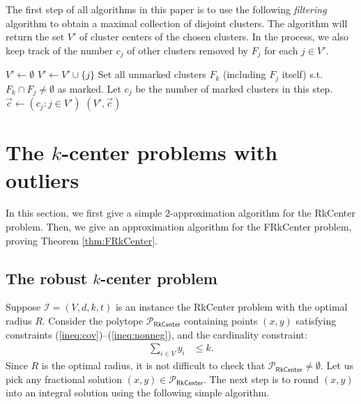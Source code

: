 \documentclass[a4paper,11pt]{article}
\newcommand{\I}{\mathcal{I}}
\renewcommand{\P}{\mathcal{P}}
\begin{document}
The first step of all algorithms in this paper is to use the following \emph{filtering} algorithm to obtain a maximal collection of disjoint clusters. The algorithm will return the set $V'$ of cluster centers of the chosen clusters. In the process, we also keep track of the number $c_j$ of other clusters removed by $F_j$ for each $j \in V'$.

\begin{algorithm}[h]
\caption{$\textsc{RFiltering}\left(x,y \right)$}
\begin{algorithmic}[1]
\STATE $V' \gets \emptyset$
	\STATE $V' \gets V' \cup \{j\}$
	\STATE Set all unmarked clusters $F_k$ (including $F_j$ itself) s.t. $F_k \cap F_j \neq \emptyset$ as marked.
	\STATE Let $c_j$ be the number of marked clusters in this step. 
\ENDFOR
\STATE $\vec{c} \gets (c_j: j \in V')$
\RETURN $(V', \vec{c})$
\end{algorithmic} 
\end{algorithm}



\section{The $k$-center problems with outliers}
In this section, we first give a simple $2$-approximation algorithm for the \textsf{RkCenter} problem. Then, we give an approximation algorithm for the \textsf{FRkCenter} problem, proving Theorem \ref{thm:FRkCenter}.

\subsection{The robust $k$-center problem}
Suppose $\I = (V,d,k,t)$ is an instance the \textsf{RkCenter} problem with the optimal radius $R$. Consider the polytope $\P_\textsf{RkCenter}$ containing points $(x, y)$ satisfying constraints (\ref{ineq:cov})--(\ref{ineq:nonneg}), and the cardinality constraint: %
\begin{align}
	\sum_{i \in V} y_i &\leq k. \label{ineq:cardinality} 
\end{align}
Since $R$ is the optimal radius, it is not difficult to check that $\P_\textsf{RkCenter} \neq \emptyset$. Let us pick any fractional solution $(x,y) \in \P_\textsf{RkCenter}$. The next step is to round $(x,y)$ into an integral solution using the following simple algorithm.
\end{document}
